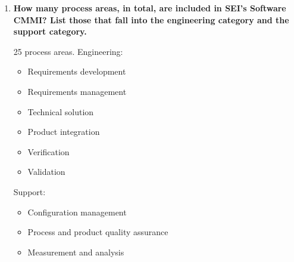 \documentclass[11pt]{article}
\begin{document}
\begin{enumerate}
    \item \textbf{How many process areas, in total, are included in SEI's Software CMMI? List those that fall into the engineering category and the support category.}
    
    25 process areas. 
    \newline\newline
    Engineering:
    \begin{itemize}
        \item Requirements development
        \item Requirements management
        \item Technical solution
        \item Product integration
        \item Verification
        \item Validation
    \end{itemize}
    
    Support: 
    \begin{itemize}
        \item Configuration management
        \item Process and product quality assurance 
        \item Measurement and analysis 
    \end{itemize}

\end{enumerate}
\end{document}
